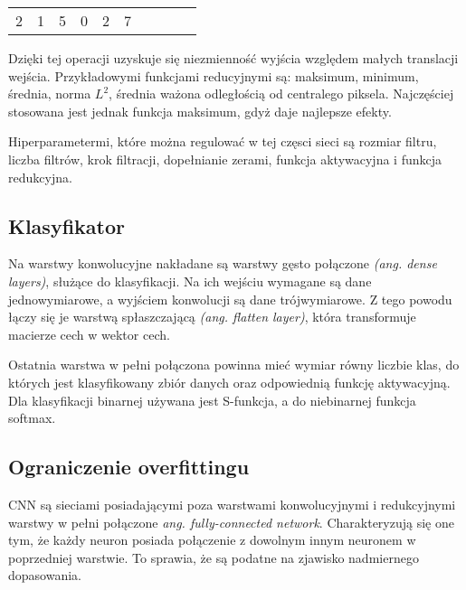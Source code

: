 \begin{table}[h]
\begin{tabular}{llllllllll}
\multicolumn{1}{|l|}{\cellcolor[HTML]{FFCB2F}2} & \multicolumn{1}{l|}{\cellcolor[HTML]{FFCB2F}1}  & \multicolumn{1}{l|}{\cellcolor[HTML]{FFCB2F}5} & \multicolumn{1}{l|}{\cellcolor[HTML]{32CB00}0} & \multicolumn{1}{l|}{\cellcolor[HTML]{32CB00}2} & \multicolumn{1}{l|}{\cellcolor[HTML]{32CB00}7} &  &                       &                                                 &                                                \\ \cline{1-6}
\end{tabular}
\end{table}

Dzięki tej operacji uzyskuje się niezmienność wyjścia względem małych translacji wejścia. Przykładowymi funkcjami reducyjnymi są: maksimum, minimum, średnia, norma \begin{math}L^{2}\end{math}, średnia ważona odległością od centralego piksela. Najczęściej stosowana jest jednak funkcja maksimum, gdyż daje najlepsze efekty. \cite{Scherer2010EvaluationOP}

Hiperparametermi, które można regulować w tej częsci sieci są rozmiar filtru, liczba filtrów, krok filtracji, dopełnianie zerami, funkcja aktywacyjna i funkcja redukcyjna.

\subsection{Klasyfikator}
Na warstwy konwolucyjne nakładane są warstwy gęsto połączone \textit{(ang. dense layers)}, służące do klasyfikacji. Na  ich wejściu wymagane są dane jednowymiarowe, a wyjściem konwolucji są dane trójwymiarowe. Z tego powodu łączy się je warstwą spłaszczającą \textit{(ang. flatten layer)}, która transformuje macierze cech w wektor cech.

Ostatnia warstwa w pełni połączona powinna mieć wymiar równy liczbie klas, do których jest klasyfikowany zbiór danych oraz odpowiednią funkcję aktywacyjną. Dla klasyfikacji binarnej używana jest S-funkcja, a do niebinarnej funkcja softmax.

\subsection{Ograniczenie overfittingu}
CNN są sieciami posiadającymi poza warstwami konwolucyjnymi i redukcyjnymi warstwy w pełni połączone \textit{ang. fully-connected network}. Charakteryzują się one tym, że każdy neuron posiada połączenie z dowolnym innym neuronem w poprzedniej warstwie. To sprawia, że są podatne na zjawisko nadmiernego dopasowania. 

